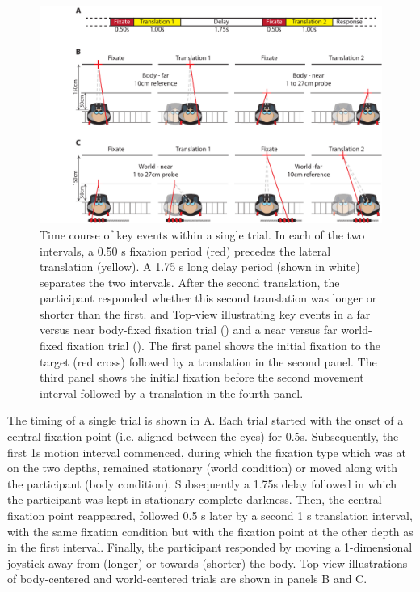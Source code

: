 
\begin{figure}
    \includegraphics[width=1.0\textwidth]{src/paper4/p4_figure1.pdf}

    \caption{ Time course  of key events within a single trial. In each of the two intervals, a 0.50 \si{\second} fixation period (red) precedes the lateral translation (yellow). A 1.75 \si{\second} long delay period (shown in white) separates the two intervals. After the second translation, the participant responded whether this second translation was longer or shorter than the first.  and  Top-view illustrating key events in a far versus near body-fixed fixation trial () and a near versus far world-fixed fixation trial (). The first panel shows the initial fixation to the target (red cross) followed by a translation in the second panel. The third panel shows the initial fixation before the second movement interval followed by a translation in the fourth panel.}
    \label{p4:fig1}    
\end{figure}
 
The timing of a single trial is shown in A. Each trial started with the onset of a central fixation point (i.e. aligned between the eyes) for 0.5s. Subsequently, the first 1s motion interval commenced, during which the fixation type which was at on the two depths, remained stationary (world condition) or moved along with the participant (body condition). Subsequently a 1.75s delay followed in which the participant was kept in stationary complete darkness. Then, the central fixation point reappeared, followed 0.5 \si{\second} later by a second 1 \si{\second} translation interval, with the same fixation condition but with the fixation point at the other depth as in the first interval. Finally, the participant responded by moving a 1-dimensional joystick away from (longer) or towards (shorter) the body. Top-view illustrations of body-centered and world-centered trials are shown in  panels B and C.

